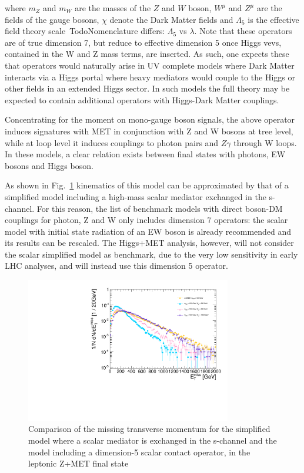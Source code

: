 where $m_Z$ and $m_W$ are the masses of the $Z$ and $W$ boson, $W^{\mu}$ and $Z^{\mu}$
are the fields of the gauge bosons, $\chi$ denote the Dark Matter fields
and $\Lambda_5$ is the effective field theory scale~Todo{Nomenclature differs: $\Lambda_5$ vs $\lambda$}. Note that these operators are of true dimension 7, 
but reduce to effective dimension 5 once Higgs vevs, contained in the W and Z mass terms, are inserted.  
As such, one expects  these that operators would naturally arise in UV complete models where Dark Matter 
interacts via a Higgs portal where heavy mediators would couple to the Higgs or other fields in an extended Higgs sector. 
In such models the full theory may be expected to contain additional operators with Higgs-Dark Matter couplings. 

Concentrating  for the moment on mono-gauge boson signals, the above operator induces signatures with 
MET in conjunction with Z and W bosons at tree level,
while at loop level it induces couplings to photon pairs and $Z \gamma$ through W loops.
In these models, a clear relation exists between final states with photons, EW bosons
and Higgs boson. 

As shown in Fig.~\ref{fig:EW_EFT5_Zlep_MET}
kinematics of this model can be approximated by that of a simplified model including 
a high-mass scalar mediator exchanged in the s-channel. For this reason, 
the list of benchmark models with direct boson-DM couplings for photon, Z and W 
only includes dimension 7 operators: the scalar model with initial state radiation of an EW boson
is already recommended and its results can be rescaled. The Higgs+MET analysis,
however, will not consider the scalar simplified model as benchmark, due to the very low sensitivity 
in early LHC analyses, and will instead use this dimension 5 operator. 

\begin{figure}
	\includegraphics[width=0.8\textwidth]{figures/EW/pt_vv2_xxDHDH_vs_ScalarMediator.pdf}
	\caption{Comparison of the missing transverse momentum for the simplified model
		where a scalar mediator is exchanged in the s-channel and the model including 
		a dimension-5 scalar contact operator, in the leptonic Z+MET final state}
	\label{fig:EW_EFT5_Zlep_MET}
\end{figure}

